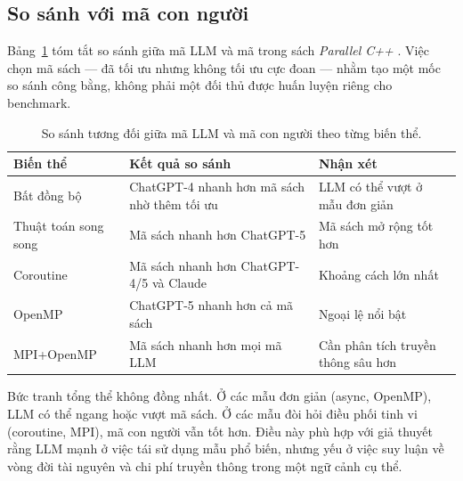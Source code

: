\subsection{So sánh với mã con người}

Bảng~\ref{tab:human} tóm tắt so sánh giữa mã LLM và mã trong sách
\emph{Parallel C++} \cite{diehl2024book}. Việc chọn mã sách — đã tối ưu nhưng
không tối ưu cực đoan — nhằm tạo một mốc so sánh công bằng, không phải một đối
thủ được huấn luyện riêng cho benchmark.

\begin{table}[H]
\centering
\small
\caption{So sánh tương đối giữa mã LLM và mã con người theo từng biến thể.}
\label{tab:human}
\begin{tabularx}{\textwidth}{@{}p{3.2cm} X p{3.3cm}@{}}
\toprule
\textbf{Biến thể} & \textbf{Kết quả so sánh} & \textbf{Nhận xét} \\
\midrule
Bất đồng bộ & ChatGPT-4 nhanh hơn mã sách nhờ thêm tối ưu & LLM có thể vượt ở mẫu đơn giản \\
Thuật toán song song & Mã sách nhanh hơn ChatGPT-5 & Mã sách mở rộng tốt hơn \\
Coroutine & Mã sách nhanh hơn ChatGPT-4/5 và Claude & Khoảng cách lớn nhất \\
OpenMP & ChatGPT-5 nhanh hơn cả mã sách & Ngoại lệ nổi bật \\
MPI+OpenMP & Mã sách nhanh hơn mọi mã LLM & Cần phân tích truyền thông sâu hơn \\
\bottomrule
\end{tabularx}
\end{table}

Bức tranh tổng thể không đồng nhất. Ở các mẫu đơn giản (async, OpenMP), LLM có
thể ngang hoặc vượt mã sách. Ở các mẫu đòi hỏi điều phối tinh vi (coroutine,
MPI), mã con người vẫn tốt hơn. Điều này phù hợp với giả thuyết rằng LLM mạnh ở
việc tái sử dụng mẫu phổ biến, nhưng yếu ở việc suy luận về vòng đời tài nguyên
và chi phí truyền thông trong một ngữ cảnh cụ thể.
